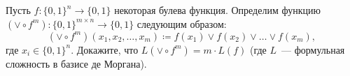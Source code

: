 Пусть $f\colon \{0, 1\}^n \to \{0, 1\}$ некоторая булева функция. Определим функцию $\left( \vee \circ f^m
\right)\colon \{0, 1\}^{m \times n} \to \{0, 1\}$ следующим образом:
$$
    \left( \vee \circ f^m \right)(x_1, x_2, \dots, x_m) \coloneqq f(x_1) \lor f(x_2) \lor \dots \lor f(x_m),
$$
где $x_i \in \{0, 1\}^n$. Докажите, что $L\left( \vee \circ f^m \right) = m \cdot L(f)$ (где $L$~---
формульная сложность в базисе де Моргана).
    